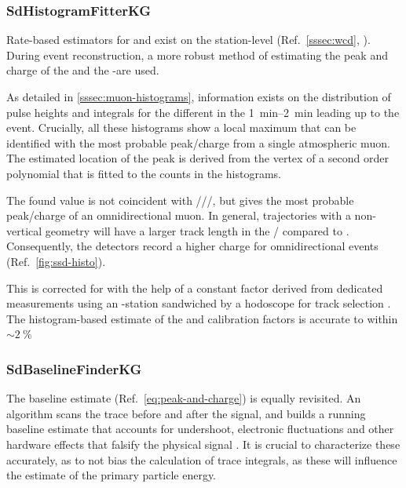 \subsubsection{SdHistogramFitterKG}
\label{sssec:reconstruction-histogram-fitter}

Rate-based estimators for \Ivem and \Imip exist on the station-level (Ref.\ 
\cref{sssec:wcd}, ). During event reconstruction, a
more robust method of estimating the peak and charge of the \LPMTs and the
\SSD-\PMT are used. 

As detailed in \cref{sssec:muon-histograms}, information exists on the 
distribution of pulse heights and integrals for the different \PMTs in the 
\SIrange{1}{2}{\minute} leading up to the event. Crucially, all these 
histograms show a local maximum that can be identified with the most probable 
peak/charge from a single atmospheric muon. The estimated location of the peak 
is derived from the vertex of a second order polynomial that is fitted
to the counts in the histograms.

The found value is not coincident with \Ivem/\Qvem/\Imip/\Qmip, but gives the
most probable peak/charge of an omnidirectional muon. In general, trajectories
with a non-vertical geometry will have a larger track length in the \WCD/\SSD 
compared to \VEMs. Consequently, the detectors record a higher charge for 
omnidirectional events (Ref.\ \cref{fig:ssd-histo}). 

This is corrected for with the help of a constant factor derived from dedicated
measurements using an \SD-station sandwiched by a \RPC hodoscope for track 
selection \cite{assisResultsGianniNavarra2017}. The histogram-based estimate of
the \WCD and \SSD calibration factors is accurate to within 
$\sim\SI{2}{\percent}$ \cite{bertouCalibrationSurfaceArray2006, 
filipCalibrationScintillatorSurface2025}

\subsubsection{SdBaselineFinderKG}
\label{sssec:reconstruction-baseline-finder}

The \PMT baseline estimate (Ref.\ \cref{eq:peak-and-charge}) is equally 
revisited. An algorithm scans the
trace before and after the \EAS signal, and builds a running baseline estimate
that accounts for \PMT undershoot, electronic fluctuations and other hardware 
effects that falsify the physical signal \cite{schulzNewBaselineAlgorithm2023}.
It is crucial to characterize these accurately, as to not bias the calculation 
of trace integrals, as these will influence the estimate of the primary 
particle energy.

